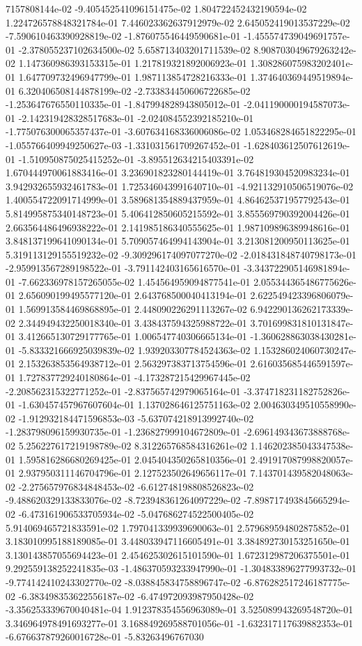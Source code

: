 7157808144e-02	-9.405452541096151475e-02	1.804722452432190594e-02	1.224726578848321784e-01	7.446023362637912979e-02	2.645052419013537229e-02	-7.590610463390928819e-02	-1.876075546449590681e-01	-1.455574739049691757e-01	-2.378055237102634500e-02	5.658713403201711539e-02	8.908703049679263242e-02	1.147360986393153315e-01	1.217819321892006923e-01	1.308286075983202401e-01	1.647709732496947799e-01	1.987113854728216333e-01	1.374640369449519894e-01	6.320406508144878199e-02	-2.733834450606722685e-02	-1.253647676550110335e-01	-1.847994828943805012e-01	-2.041190000194587073e-01	-2.142319428328517683e-01	-2.024084552392185210e-01	-1.775076300065357437e-01	-3.607634168336006086e-02	1.053468284651822295e-01	-1.055766409949250627e-03	-1.331031561709267452e-01	-1.628403612507612619e-01	-1.510950875025415252e-01	-3.895512634215403391e-02	1.670444970061883416e-01	3.236901823280144419e-01	3.764819304520983234e-01	3.942932655932461783e-01	1.725346043991640710e-01	-4.921132910506519076e-02	1.400554722091714999e-01	3.589681354889437959e-01	4.864625371957792543e-01	5.814995875340148723e-01	5.406412850605215592e-01	3.855569790392004426e-01	2.663564486496938222e-01	2.141985186340555625e-01	1.987109896389948616e-01	3.848137199641090134e-01	5.709057464994143904e-01	3.213081200950113625e-01	5.319113129155519232e-02	-9.309296174097077270e-02	-2.018431848740798173e-01	-2.959913567289198522e-01	-3.791142403165616570e-01	-3.343722905146981894e-01	-7.662336978157265055e-02	1.454564959094877541e-01	2.055344365486775626e-01	2.656090199495577120e-01	2.643768500040413194e-01	2.622549423396806079e-01	1.569913584469868895e-01	2.448090226291113267e-02	6.942290136262173339e-02	2.344949432250018340e-01	3.438437594325988722e-01	3.701699831810131847e-01	3.412665130729177765e-01	1.006547740306665134e-01	-1.360628863038430281e-01	-5.833321666925039839e-02	1.939203307784524363e-02	1.153286024060730247e-01	2.153263853564938712e-01	2.563297383713754596e-01	2.616035685446591597e-01	1.727837729240180864e-01	-4.173287215429967445e-02	-2.208562315322771252e-01	-2.837565742979065164e-01	-3.374718231182752826e-01	-1.630457457967607604e-01	1.137028646125751163e-02	2.004630349510558990e-02	-1.912932184471596853e-03	-5.637074218913992740e-02	-1.283798096159930735e-01	-1.236827999104672809e-01	-2.696149343673888768e-02	5.256227617219198789e-02	8.312265768584316261e-02	1.146202385043347538e-01	1.595816286680269425e-01	2.045404350265810356e-01	2.491917087998820057e-01	2.937950311146704796e-01	2.127523502649656117e-01	7.143701439582048063e-02	-2.275657976834848453e-02	-6.612748198808526823e-02	-9.488620329133833076e-02	-8.723948361264097229e-02	-7.898717493845665294e-02	-6.473161906533705934e-02	-5.047686274522500405e-02	5.914069465721833591e-02	1.797041339939690063e-01	2.579689594802875852e-01	3.183010995188189085e-01	3.448033947116605491e-01	3.384892730153251650e-01	3.130143857055694423e-01	2.454625302615101590e-01	1.672312987206375501e-01	9.292559138252241835e-03	-1.486370593233947990e-01	-1.304833896277993732e-01	-9.774142410243302770e-02	-8.038845834758896747e-02	-6.876282517246187775e-02	-6.383498353622556187e-02	-6.474972093987950428e-02	-3.356253339670040481e-04	1.912378354556963089e-01	3.525089943269548720e-01	3.346964978491693277e-01	3.168849269588701056e-01	-1.632317117639882353e-01	-6.676637879260016728e-01	-5.83263496767030